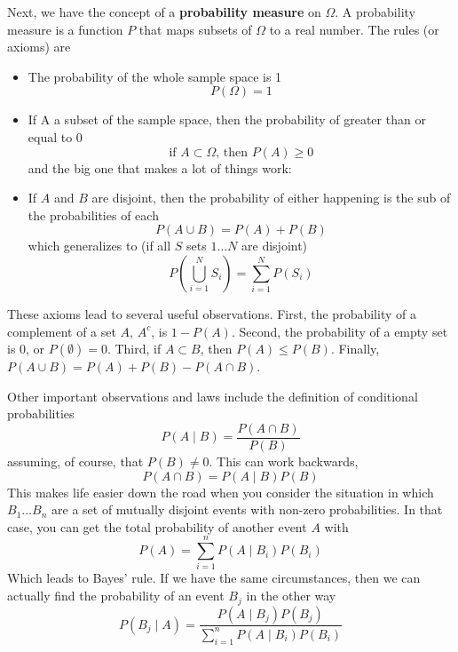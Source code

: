 Next, we have the concept of a {\bf probability measure} on $\Omega$. A probability measure is a function $P$ that maps subsets of $\Omega$ to a real number. The rules (or axioms) are
\begin{itemize}
\item{The probability of the whole sample space is 1}
\begin{equation}
P\left(\Omega\right) = 1
\end{equation}
\item{If A a subset of the sample space, then the probability of greater than or equal to 0}
\begin{equation}
\mbox{if } A \subset \Omega \mbox{, then } P\left(A\right) \ge 0
\end{equation}
and the big one that makes a lot of things work:
\item{If $A$ and $B$ are disjoint, then the probability of either happening is the sub of the probabilities of each}
\begin{equation}
P\left(A \cup B\right) = P\left(A\right) + P\left(B\right)
\end{equation}
which generalizes to (if all $S$ sets $1\ldots N$ are disjoint)
\begin{equation}
P\left(\bigcup_{i=1}^N S_i\right)= \sum_{i=1}^N P\left(S_i\right)
\end{equation}
\end{itemize}

These axioms lead to several useful observations. First, the probability of a complement of a set $A$, $A^c$, is $1-P\left(A\right)$. Second, the probability of a empty set is 0, or $P\left(\emptyset\right) = 0$. Third, if $A \subset B$, then $P\left(A\right) \le P\left(B\right)$. Finally, $P\left(A \cup B\right) = P\left(A\right) + P\left(B\right) - P\left(A\cap B\right)$.

Other important observations and laws include the definition of conditional probabilities
\begin{equation}
P\left(A\mid B\right) = \frac{P\left(A\cap B\right)}{P\left(B\right)}
\end{equation}
assuming, of course, that $P\left(B\right) \neq 0$. This can work backwards,
\begin{equation}
P\left(A\cap B\right) = P\left(A\mid B\right)P\left(B\right)
\end{equation}
This makes life easier down the road when you consider the situation in which $B_1\ldots B_n$ are a set of mutually disjoint events with non-zero probabilities. In that case, you can get the total probability of another event $A$ with
\begin{equation}
P\left(A\right) = \sum_{i=1}^n P\left(A \mid B_i \right)P\left(B_i\right)
\end{equation}
Which leads to Bayes' rule. If we have the same circumstances, then we can actually find the probability of an event $B_j$ in the other way
\begin{equation}\label{eq:bayes}
P\left(B_j \mid A\right) = \frac{P\left(A\mid B_j\right)P\left(B_j\right)}{\sum_{i=1}^n P\left(A \mid B_i \right)P\left(B_i\right)}
\end{equation}

